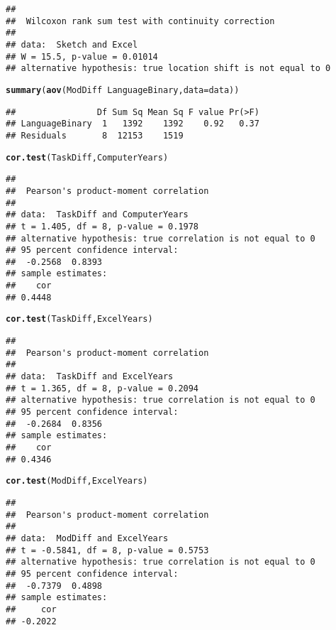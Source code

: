 \documentclass[12pt, twoside, a4paper, openright]{report}\usepackage[]{graphicx}\usepackage[]{color}
\makeatletter
\newcommand{\hlopt}[1]{\textcolor[rgb]{0,0,0}{#1}}%
\newcommand{\hlstd}[1]{\textcolor[rgb]{0.345,0.345,0.345}{#1}}%
\newcommand{\hlkwc}[1]{\textcolor[rgb]{0.333,0.667,0.333}{#1}}%
\newcommand{\hlkwd}[1]{\textcolor[rgb]{0.737,0.353,0.396}{\textbf{#1}}}%
\newenvironment{kframe}{%
 \def\at@end@of@kframe{}%
 \ifinner\ifhmode%
  \def\at@end@of@kframe{\end{minipage}}%
  \begin{minipage}{\columnwidth}%
 \fi\fi%
 \def\FrameCommand##1{\hskip\@totalleftmargin \hskip-\fboxsep
 \colorbox{shadecolor}{##1}\hskip-\fboxsep
     \hskip-\linewidth \hskip-\@totalleftmargin \hskip\columnwidth}%
 \MakeFramed {\advance\hsize-\width
   \@totalleftmargin\z@ \linewidth\hsize
   \@setminipage}}%
 {\par\unskip\endMakeFramed%
 \at@end@of@kframe}
\newenvironment{knitrout}{}{} %
\makeatother
\begin{document}
\begin{knitrout}
\begin{kframe}
\begin{verbatim}
## 
## 	Wilcoxon rank sum test with continuity correction
## 
## data:  Sketch and Excel
## W = 15.5, p-value = 0.01014
## alternative hypothesis: true location shift is not equal to 0
\end{verbatim}
\begin{alltt}
\hlkwd{summary}\hlstd{(}\hlkwd{aov}\hlstd{(ModDiff} \hlopt{~} \hlstd{LanguageBinary,} \hlkwc{data} \hlstd{= data))}
\end{alltt}
\begin{verbatim}
##                Df Sum Sq Mean Sq F value Pr(>F)
## LanguageBinary  1   1392    1392    0.92   0.37
## Residuals       8  12153    1519
\end{verbatim}
\end{kframe}
\end{knitrout}


\begin{knitrout}
\color{fgcolor}\begin{kframe}
\begin{alltt}
\hlkwd{cor.test}\hlstd{(TaskDiff, ComputerYears)}
\end{alltt}
\begin{verbatim}
## 
## 	Pearson's product-moment correlation
## 
## data:  TaskDiff and ComputerYears
## t = 1.405, df = 8, p-value = 0.1978
## alternative hypothesis: true correlation is not equal to 0
## 95 percent confidence interval:
##  -0.2568  0.8393
## sample estimates:
##    cor 
## 0.4448
\end{verbatim}
\begin{alltt}
\hlkwd{cor.test}\hlstd{(TaskDiff, ExcelYears)}
\end{alltt}
\begin{verbatim}
## 
## 	Pearson's product-moment correlation
## 
## data:  TaskDiff and ExcelYears
## t = 1.365, df = 8, p-value = 0.2094
## alternative hypothesis: true correlation is not equal to 0
## 95 percent confidence interval:
##  -0.2684  0.8356
## sample estimates:
##    cor 
## 0.4346
\end{verbatim}
\begin{alltt}
\hlkwd{cor.test}\hlstd{(ModDiff, ExcelYears)}
\end{alltt}
\begin{verbatim}
## 
## 	Pearson's product-moment correlation
## 
## data:  ModDiff and ExcelYears
## t = -0.5841, df = 8, p-value = 0.5753
## alternative hypothesis: true correlation is not equal to 0
## 95 percent confidence interval:
##  -0.7379  0.4898
## sample estimates:
##     cor 
## -0.2022
\end{verbatim}
\end{kframe}
\end{knitrout}


\end{document}
